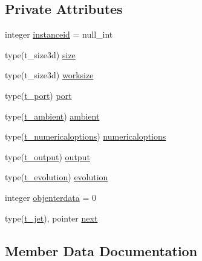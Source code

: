 \subsection*{Private Attributes}
\begin{DoxyCompactItemize}
\item 
integer \mbox{\hyperlink{structmodulejet_1_1t__jet_aa2e8f04b4f630a72d8104e4a447c0f04}{instanceid}} = null\+\_\+int
\item 
type(t\+\_\+size3d) \mbox{\hyperlink{structmodulejet_1_1t__jet_a77ec6f10368a46d258faa06d9548cd19}{size}}
\item 
type(t\+\_\+size3d) \mbox{\hyperlink{structmodulejet_1_1t__jet_abc97257c54f2dae5ec3934ead414249d}{worksize}}
\item 
type(\mbox{\hyperlink{structmodulejet_1_1t__port}{t\+\_\+port}}) \mbox{\hyperlink{structmodulejet_1_1t__jet_abef0d1561a1968f1c95fd5cd18cbe5a1}{port}}
\item 
type(\mbox{\hyperlink{structmodulejet_1_1t__ambient}{t\+\_\+ambient}}) \mbox{\hyperlink{structmodulejet_1_1t__jet_a5c0ddfbe7e1fcb5aaf86bb82ca1f4e3b}{ambient}}
\item 
type(\mbox{\hyperlink{structmodulejet_1_1t__numericaloptions}{t\+\_\+numericaloptions}}) \mbox{\hyperlink{structmodulejet_1_1t__jet_a9919421a6d0332c1f073f3098491c4f6}{numericaloptions}}
\item 
type(\mbox{\hyperlink{structmodulejet_1_1t__output}{t\+\_\+output}}) \mbox{\hyperlink{structmodulejet_1_1t__jet_ab18384f66ceb3060349c396ad89bab8f}{output}}
\item 
type(\mbox{\hyperlink{structmodulejet_1_1t__evolution}{t\+\_\+evolution}}) \mbox{\hyperlink{structmodulejet_1_1t__jet_ae66ac96af193a7d088976094bcab0166}{evolution}}
\item 
integer \mbox{\hyperlink{structmodulejet_1_1t__jet_a59c021cea89c37f4cf4e6bfaf8998e50}{objenterdata}} = 0
\item 
type(\mbox{\hyperlink{structmodulejet_1_1t__jet}{t\+\_\+jet}}), pointer \mbox{\hyperlink{structmodulejet_1_1t__jet_a87b6592380bb4c320cb6de8af1537fb9}{next}}
\end{DoxyCompactItemize}


\subsection{Member Data Documentation}
\mbox{\label{structmodulejet_1_1t__jet_a5c0ddfbe7e1fcb5aaf86bb82ca1f4e3b}} 
